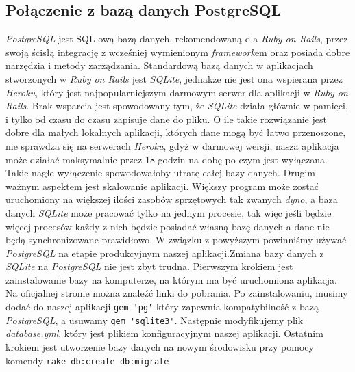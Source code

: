 \documentclass[brudnopis]{xmgr}
\begin{document}
\subsection{Połączenie z bazą danych PostgreSQL}
\textit{PostgreSQL} jest SQL-ową bazą danych, rekomendowaną dla \textit{Ruby on Rails}, przez swoją ścisłą integrację z wcześniej wymienionym \textit{framework}em oraz posiada dobre narzędzia i metody zarządzania. Standardową bazą danych w aplikacjach stworzonych w \textit{Ruby on Rails} jest \textit{SQLite}, jednakże nie jest ona wspierana przez \textit{Heroku}, który jest najpopularniejszym darmowym serwer dla aplikacji w \textit{Ruby on Rails}. Brak wsparcia jest spowodowany tym, że \textit{SQLite} działa głównie w pamięci, i tylko od czasu do czasu zapisuje dane do pliku. O ile takie rozwiązanie jest dobre dla małych lokalnych aplikacji, których dane mogą być łatwo przenoszone, nie sprawdza się na serwerach \textit{Heroku}, gdyż w darmowej wersji, nasza aplikacja może działać maksymalnie przez 18 godzin na dobę po czym jest wyłączana. Takie nagłe wyłączenie spowodowałoby utratę całej bazy danych. Drugim ważnym aspektem jest skalowanie aplikacji. Większy program może zostać uruchomiony na większej ilości zasobów sprzętowych tak zwanych \textit{dyno}, a baza danych \textit{SQLite} może pracować tylko na jednym procesie, tak więc jeśli będzie więcej procesów każdy z nich będzie posiadać własną bazę danych a dane nie będą synchronizowane prawidłowo. W związku z powyższym powinniśmy używać \textit{PostgreSQL} na etapie produkcyjnym naszej aplikacji.\newline \indent Zmiana bazy danych z \textit{SQLite} na \textit{PostgreSQL} nie jest zbyt trudna. Pierwszym krokiem jest zainstalowanie bazy na komputerze, na którym ma być uruchomiona aplikacja. Na oficjalnej stronie można znaleźć linki do pobrania. Po zainstalowaniu, musimy dodać do naszej aplikacji \verb|gem 'pg'| który zapewnia kompatybilność z bazą \textit{PostgreSQL}, a usuwamy \verb|gem 'sqlite3'|. Następnie modyfikujemy plik \textit{database.yml}, który jest plikiem konfiguracyjnym naszej aplikacji. Ostatnim krokiem jest utworzenie bazy danych na nowym środowisku przy pomocy komendy \verb|rake db:create db:migrate|  
\end{document}
